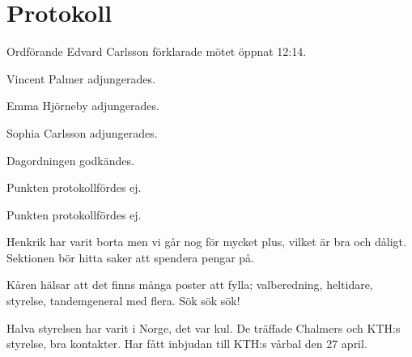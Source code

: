 \documentclass[10pt]{article}
\def\mo{Edvard Carlsson}
\begin{document}
\section*{Protokoll}
\begin{paragrafer}
		Ordförande {\mo} förklarade mötet öppnat 12:14.

	{\valavmo}

	{\valavms}

	{\valavj}

	{\tosg}

\noindent
		Vincent Palmer adjungerades.

\noindent
		Emma Hjörneby adjungerades.

\noindent
		Sophia Carlsson adjungerades.




	Dagordningen godkändes.

	\ingaprot

	\begin{fyllnadsval} %
      
	\end{fyllnadsval}

	\begin{paragrafer}
		Punkten protokollfördes ej.

		Punkten protokollfördes ej.

		Henkrik har varit borta men vi går nog för mycket plus, vilket är bra och dåligt. 
		Sektionen bör hitta saker att spendera pengar på.
		
		Kåren hälsar att det finns många poster att fylla; 
		valberedning, heltidare, styrelse, tandemgeneral med flera.
		Sök sök sök!

		Halva styrelsen har varit i Norge, det var kul. De träffade Chalmers och KTH:s styrelse, bra kontakter.  
		Har fått inbjudan till KTH:s vårbal den 27 april. 



\end{paragrafer}
\end{paragrafer}
\end{document}
